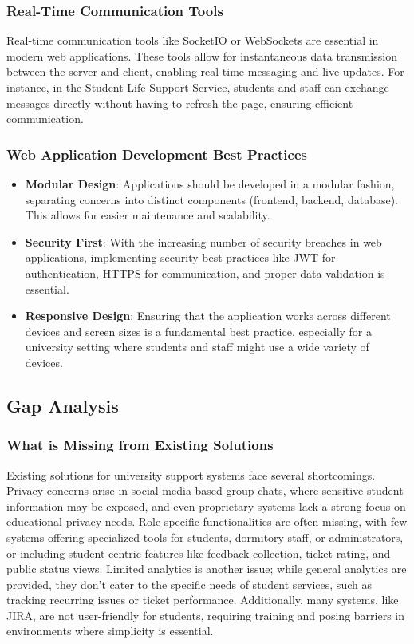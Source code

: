 	\subsubsection{Real-Time Communication Tools}
	Real-time communication tools like SocketIO or WebSockets are essential in modern web applications. These tools allow for instantaneous data transmission between the server and client, enabling real-time messaging and live updates. For instance, in the Student Life Support Service, students and staff can exchange messages directly without having to refresh the page, ensuring efficient communication.
	
	\subsubsection{Web Application Development Best Practices}
	\begin{itemize}
		\item \textbf{Modular Design}: Applications should be developed in a modular fashion, separating concerns into distinct components (frontend, backend, database). This allows for easier maintenance and scalability.
		
		\item \textbf{Security First}: With the increasing number of security breaches in web applications, implementing security best practices like JWT for authentication, HTTPS for communication, and proper data validation is essential.
		
		\item \textbf{Responsive Design}: Ensuring that the application works across different devices and screen sizes is a fundamental best practice, especially for a university setting where students and staff might use a wide variety of devices.
	\end{itemize}
		
		
\subsection{Gap Analysis}

	\subsubsection{What is Missing from Existing Solutions}
	Existing solutions for university support systems face several shortcomings. Privacy concerns arise in social media-based group chats, where sensitive student information may be exposed, and even proprietary systems lack a strong focus on educational privacy needs. Role-specific functionalities are often missing, with few systems offering specialized tools for students, dormitory staff, or administrators, or including student-centric features like feedback collection, ticket rating, and public status views. Limited analytics is another issue; while general analytics are provided, they don’t cater to the specific needs of student services, such as tracking recurring issues or ticket performance. Additionally, many systems, like JIRA, are not user-friendly for students, requiring training and posing barriers in environments where simplicity is essential.
	
